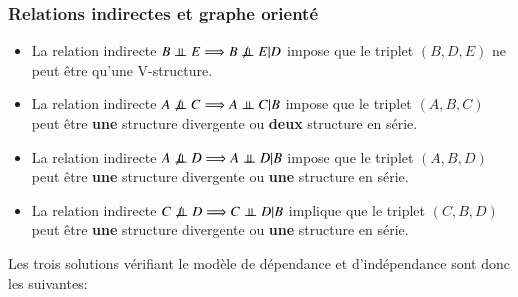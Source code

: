 \documentclass[a4paper]{article}
\begin{document}
\subsubsection{Relations indirectes et graphe orienté}
\begin{itemize}

\item La relation indirecte $B \perp\!\!\!\perp E \Longrightarrow B\not\perp\!\!\!\perp E|D$ impose que le triplet $(B,D,E)$ ne peut être qu'une V-structure.

\item La relation indirecte $A\not\perp\!\!\!\perp C \Longrightarrow A\perp\!\!\!\perp C|B$ impose que le triplet $(A,B,C)$ peut être \textbf{une} structure divergente ou \textbf{deux}  structure en série.

\item La relation indirecte $A\not\perp\!\!\!\perp D \Longrightarrow A\perp\!\!\!\perp D|B$ impose que le triplet $(A,B,D)$ peut être \textbf{une} structure divergente ou \textbf{une} structure en série.

\item La relation indirecte $C\not\perp\!\!\!\perp D \Longrightarrow C\perp\!\!\!\perp D|B$ implique que le triplet $(C,B,D)$ peut être  \textbf{une} structure divergente ou \textbf{une} structure en série.
\end{itemize}
Les  trois solutions vérifiant le modèle de dépendance et d'indépendance sont donc les suivantes:
\end{document}
